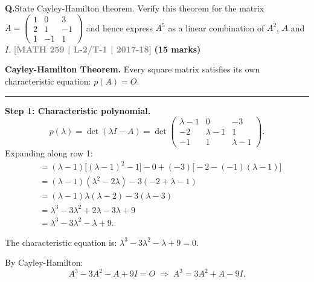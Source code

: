 \documentclass[12pt,a3paper]{article}
\newcommand{\yr}[1]{\hfill\textcolor{gray}{\small\textbf{[#1]}}}
\newcommand{\mk}[1]{\textcolor{orange!70!black}{\small\textbf{(#1 marks)}}}
\newcounter{qnum}
\newcommand{\Q}[1]{%
  \needspace{4\baselineskip}
  \refstepcounter{qnum}
  \vspace{6pt}
  \noindent\textbf{Q\theqnum.}\enspace #1\par
}
\begin{document}
\Q{State Cayley-Hamilton theorem. Verify this theorem for the matrix $A = \begin{pmatrix} 1 & 0 & 3 \\ 2 & 1 & -1 \\ 1 & -1 & 1 \end{pmatrix}$ and hence express $A^5$ as a linear combination of $A^2$, $A$ and $I$.
\yr{MATH 259 | L-2/T-1 | 2017-18} \mk{15}}



\begin{tcolorbox}[enhanced,breakable,
  colback=cB!4,colframe=cB,boxrule=0.8pt,arc=5pt,
  title={\textbf{Answer --- Cayley-Hamilton; $A^5$ as Linear Combination for
    $A=\begin{pmatrix}1&0&3\\2&1&-1\\1&-1&1\end{pmatrix}$}},
  fonttitle=\bfseries\color{white},colbacktitle=cB]

\textbf{Cayley-Hamilton Theorem.} Every square matrix satisfies its own
characteristic equation: $p(A)=O$.

\medskip\textcolor{cB}{\rule{\textwidth}{0.4pt}}

\textbf{Step 1: Characteristic polynomial.}
\[
  p(\lambda)=\det(\lambda I-A)
  =\det\begin{pmatrix}\lambda-1&0&-3\\-2&\lambda-1&1\\-1&1&\lambda-1\end{pmatrix}.
\]
Expanding along row 1:
\begin{align*}
  &=(\lambda-1)\bigl[(\lambda-1)^2-1\bigr]-0+(-3)\bigl[-2-(-1)(\lambda-1)\bigr]\\
  &=(\lambda-1)(\lambda^2-2\lambda)-3(-2+\lambda-1)\\
  &=(\lambda-1)\lambda(\lambda-2)-3(\lambda-3)\\
  &=\lambda^3-3\lambda^2+2\lambda-3\lambda+9\\
  &=\lambda^3-3\lambda^2-\lambda+9.
\end{align*}

The characteristic equation is: $\lambda^3-3\lambda^2-\lambda+9=0$.

By Cayley-Hamilton:
\[
  \boxed{A^3 - 3A^2 - A + 9I = O \;\Longrightarrow\; A^3 = 3A^2 + A - 9I.}
\]


\end{tcolorbox}
\end{document}
